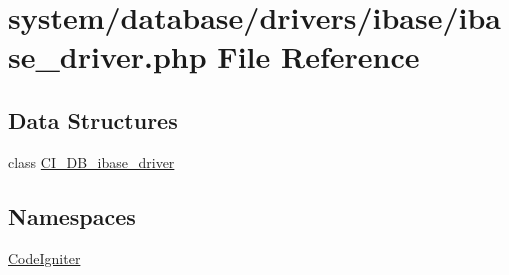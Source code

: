 \hypertarget{ibase__driver_8php}{}\section{system/database/drivers/ibase/ibase\+\_\+driver.php File Reference}
\label{ibase__driver_8php}
\subsection*{Data Structures}
\begin{DoxyCompactItemize}
\item 
class \mbox{\hyperlink{class_c_i___d_b__ibase__driver}{C\+I\+\_\+\+D\+B\+\_\+ibase\+\_\+driver}}
\end{DoxyCompactItemize}
\subsection*{Namespaces}
\begin{DoxyCompactItemize}
\item 
 \mbox{\hyperlink{namespace_code_igniter}{Code\+Igniter}}
\end{DoxyCompactItemize}
